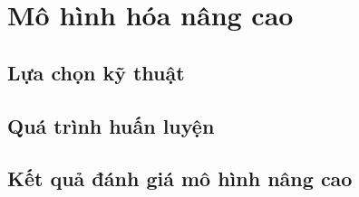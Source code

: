 \clearpage
\section{Mô hình hóa nâng cao} 
\subsection{Lựa chọn kỹ thuật}

\subsection{Quá trình huấn luyện}

\subsection{Kết quả đánh giá mô hình nâng cao}
